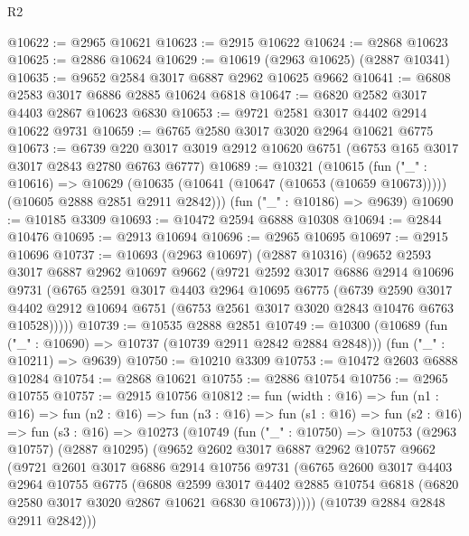 \begin{lexlean}{R2}
\begin{coremodule}
@10622 := @2965 @10621
@10623 := @2915 @10622
@10624 := @2868 @10623
@10625 := @2886 @10624
@10629 := @10619 (@2963 @10625) (@2887 @10341)
@10635 := @9652 @2584 @3017 @6887 @2962 @10625 @9662
@10641 := @6808 @2583 @3017 @6886 @2885 @10624 @6818
@10647 := @6820 @2582 @3017 @4403 @2867 @10623 @6830
@10653 := @9721 @2581 @3017 @4402 @2914 @10622 @9731
@10659 := @6765 @2580 @3017 @3020 @2964 @10621 @6775
@10673 := @6739 @220 @3017 @3019 @2912 @10620 @6751 (@6753 @165 @3017 @3017 @2843 @2780 @6763 @6777)
@10689 := @10321
    (@10615
      (fun ("_" : @10616) =>
      @10629 (@10635 (@10641 (@10647 (@10653 (@10659 @10673))))) (@10605 @2888 @2851 @2911 @2842)))
    (fun ("_" : @10186) => @9639)
@10690 := @10185 @3309
@10693 := @10472 @2594 @6888 @10308
@10694 := @2844 @10476
@10695 := @2913 @10694
@10696 := @2965 @10695
@10697 := @2915 @10696
@10737 := @10693
    (@2963 @10697)
    (@2887 @10316)
    (@9652
      @2593
      @3017
      @6887
      @2962
      @10697
      @9662
      (@9721
        @2592
        @3017
        @6886
        @2914
        @10696
        @9731
        (@6765
          @2591
          @3017
          @4403
          @2964
          @10695
          @6775
          (@6739
            @2590
            @3017
            @4402
            @2912
            @10694
            @6751
            (@6753 @2561 @3017 @3020 @2843 @10476 @6763 @10528)))))
@10739 := @10535 @2888 @2851
@10749 := @10300
    (@10689 (fun ("_" : @10690) => @10737 (@10739 @2911 @2842 @2884 @2848)))
    (fun ("_" : @10211) => @9639)
@10750 := @10210 @3309
@10753 := @10472 @2603 @6888 @10284
@10754 := @2868 @10621
@10755 := @2886 @10754
@10756 := @2965 @10755
@10757 := @2915 @10756
@10812 := fun (width : @16) =>
  fun (n1 : @16) =>
  fun (n2 : @16) =>
  fun (n3 : @16) =>
  fun (s1 : @16) =>
  fun (s2 : @16) =>
  fun (s3 : @16) =>
  @10273
    (@10749
      (fun ("_" : @10750) =>
      @10753
        (@2963 @10757)
        (@2887 @10295)
        (@9652
          @2602
          @3017
          @6887
          @2962
          @10757
          @9662
          (@9721
            @2601
            @3017
            @6886
            @2914
            @10756
            @9731
            (@6765
              @2600
              @3017
              @4403
              @2964
              @10755
              @6775
              (@6808
                @2599
                @3017
                @4402
                @2885
                @10754
                @6818
                (@6820 @2580 @3017 @3020 @2867 @10621 @6830 @10673)))))
        (@10739 @2884 @2848 @2911 @2842)))

\end{coremodule}
\end{lexlean}
